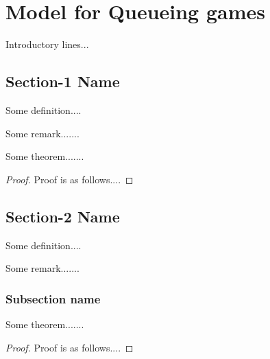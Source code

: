 \chapter{Model for Queueing games}

Introductory lines...



\section{Section-1 Name}
\begin{definition}\label{abc3}
Some definition....
\end{definition}

\begin{remark}
Some remark.......
\end{remark}



\begin{theorem}
Some theorem.......
\end{theorem}

\begin{proof}
Proof is as follows....
\end{proof}

\section{Section-2 Name}
\begin{definition}\label{abc4}
Some definition....
\end{definition}

\begin{remark}
Some remark.......
\end{remark}

\subsection{Subsection name}

\begin{theorem}
Some theorem.......
\end{theorem}

\begin{proof}
Proof is as follows....
\end{proof}
